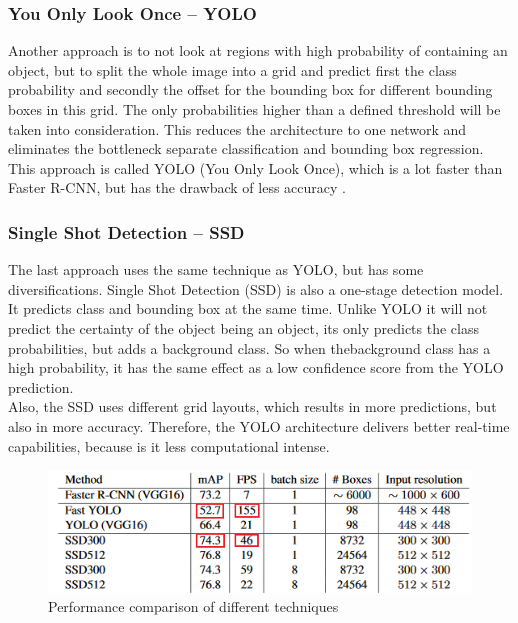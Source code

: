 \subsubsection{You Only Look Once -- YOLO}

Another approach is to not look at regions with high probability of containing an object, but to split the whole image into a grid and predict first the class probability and secondly the offset for the bounding box for different bounding boxes in this grid. The only probabilities higher than a defined threshold will be taken into consideration. This reduces the architecture to one network and eliminates the bottleneck separate classification and bounding box regression. This approach is called YOLO (You Only Look Once), which is a lot faster than Faster R-CNN, but has the drawback of less accuracy \cite{tim3}.

\subsubsection{Single Shot Detection -- SSD}

The last approach uses the same technique as YOLO, but has some diversifications. Single Shot Detection (SSD) is also a one-stage detection model. It predicts class and bounding box at the same time. Unlike YOLO it will not predict the certainty of the object being an object, its only predicts the class probabilities, but adds a background class. So when thebackground class has a high probability, it has the same effect as a low confidence score from the YOLO prediction.\\

Also, the SSD uses different grid layouts, which results in more predictions, but also in more accuracy. Therefore, the YOLO architecture delivers better real-time capabilities, because is it less computational intense.

\begin{figure}[H]
\centering
\includegraphics{sources/tempsnip.png}
\caption[Performance comparison of different techniques]{Performance comparison of different techniques \cite{tim5}}
\label{fig:depthwise_convolution}
\end{figure}


